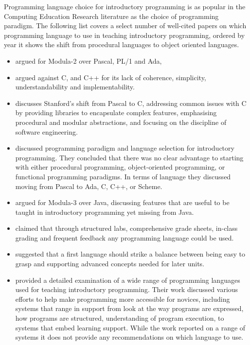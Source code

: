 Programming language choice for introductory programming is as popular in the Computing Education Research literature as the choice of programming paradigm. The following list covers a select number of well-cited papers on which programming language to use in teaching introductory programming, ordered by year it shows the shift from procedural languages to object oriented languages.

\begin{itemize}[noitemsep,nolistsep]
	\item \citet{Koffman:1988} argued for Modula-2 over Pascal, PL/1 and Ada, 
	\item \citet{Mody:1991} argued against C, and C++ for its lack of coherence, simplicity, understandability and implementability. 

	\item \citet{Roberts:1993} discusses Stanford's shift from Pascal to C, addressing common issues with C by providing libraries to encapsulate complex features, emphasising procedural and modular abstractions, and focusing on the discipline of software engineering.

	\item \citet{Brilliant:1996} discussed programming paradigm and language selection for introductory programming. They concluded that there was no clear advantage to starting with either procedural programming, object-oriented programming, or functional programming paradigms. In terms of language they discussed moving from Pascal to Ada, C, C++, or Scheme.

	\item \citet{Boszormenyi:1998} argued for Modula-3 over Java, discussing features that are useful to be taught in introductory programming yet missing from Java.

	\item \citet{Howell:2003} claimed that through structured labs, comprehensive grade sheets, in-class grading and frequent feedback any programming language could be used.

	\item \citet{Gupta:2004} suggested that a first language should strike a balance between being easy to grasp and supporting advanced concepts needed for later units.

	\item \citet{Kelleher:2005} provided a detailed examination of a wide range of programming languages used for teaching introductory programming. Their work discussed various efforts to help make programming more accessible for novices, including systems that range in support from look at the way programs are expressed, how programs are structured, understanding of program execution, to systems that embed learning support. While the work reported on a range of systems it does not provide any recommendations on which language to use.


\end{itemize}
